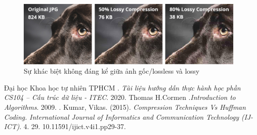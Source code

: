 \documentclass[14pt]{extreport}
\begin{document}
\begin{center}
    \begin{figure}[H]
    \begin{center}
     \includegraphics[scale=0.4]{lossy_lossless.jpg}
    \end{center}
    \caption{Sự khác biệt không đáng kể giữa ảnh gốc/lossless và lossy }
    \label{refhinh1}
    \end{figure}
\end{center}
\begin{thebibliography}{4}
Đại học Khoa học tự nhiên TPHCM . {\it Tài liệu hướng dẫn thực hành học phần CS104 – Cấu trúc dữ liệu - ITEC}. 2020.
Thomas H.Cormen  .{\it  Introduction to Algorithms}. 2009.
.
Kumar, Vikas. (2015). {\it Compression Techniques Vs Huffman Coding. International Journal of Informatics and Communication Technology (IJ-ICT)}. 4. 29. 10.11591/ijict.v4i1.pp29-37. 

\end{thebibliography}
\end{document}
